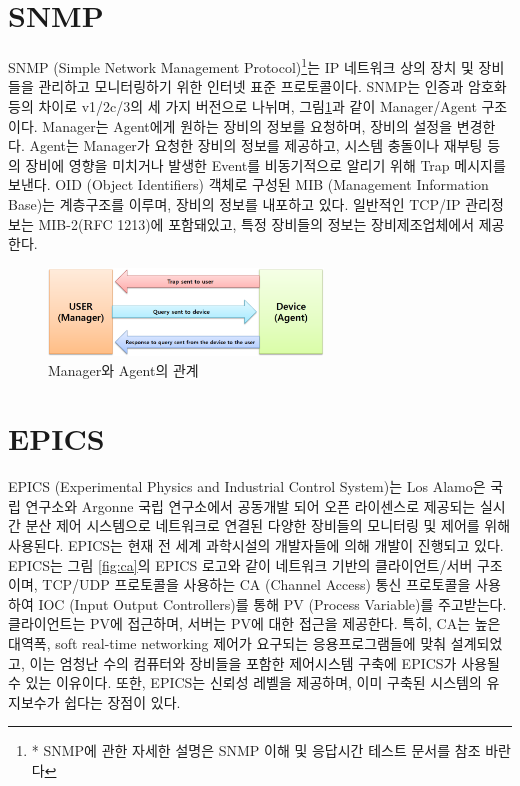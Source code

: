 \documentclass[11pt
  , a4paper
  , article
  , oneside
]{memoir}
\begin{document}
\section{SNMP}
SNMP (Simple Network Management Protocol)\footnote{* SNMP에 관한 자세한 설명은 SNMP 이해 및 응답시간 테스트 문서를 참조 바란다}는 IP 네트워크 상의 장치 및 장비들을 관리하고 모니터링하기 위한 인터넷 표준 프로토콜이다\citep{snmp}. SNMP는 인증과 암호화 등의 차이로 v1/2c/3의 세 가지 버전으로 나뉘며, 그림\ref{fig:relationship_m_a}과 같이 Manager/Agent 구조이다\citep{snmpm_a}. Manager는 Agent에게 원하는 장비의 정보를 요청하며, 장비의 설정을 변경한다. Agent는 Manager가 요청한 장비의 정보를 제공하고, 시스템 충돌이나 재부팅 등의 장비에 영향을 미치거나 발생한 Event를 비동기적으로 알리기 위해 Trap 메시지를 보낸다. OID (Object Identifiers) 객체로 구성된 MIB (Management Information Base)는 계층구조를 이루며, 장비의 정보를 내포하고 있다. 일반적인 TCP/IP 관리정보는 MIB-2(RFC 1213)에 포함돼있고, 특정 장비들의 정보는 장비제조업체에서 제공한다. 

\begin{figure}[h!]
  \centering
  \includegraphics[width=0.65\textwidth]{./images/relationship_m_a.eps}
  \caption{Manager와 Agent의 관계}
  \label{fig:relationship_m_a}   
\end{figure}

\hfill

\section{EPICS}
EPICS (Experimental Physics and Industrial Control System)는 Los Alamo은 국립 연구소와 Argonne 국립 연구소에서 공동개발 되어 오픈 라이센스로 제공되는 실시간 분산 제어 시스템으로 네트워크로 연결된 다양한 장비들의 모니터링 및 제어를 위해 사용된다. EPICS는 현재 전 세계 과학시설의 개발자들에 의해 개발이 진행되고 있다. EPICS는 그림 \ref{fig:ca}의 EPICS 로고와 같이 네트워크 기반의 클라이언트/서버 구조이며, TCP/UDP 프로토콜을 사용하는 CA (Channel Access) 통신 프로토콜을 사용하여 IOC (Input Output Controllers)를 통해 PV (Process Variable)를 주고받는다. 클라이언트는 PV에 접근하며, 서버는 PV에 대한 접근을 제공한다. 특히, CA는 높은 대역폭, soft real-time networking 제어가 요구되는 응용프로그램들에 맞춰 설계되었고, 이는 엄청난 수의 컴퓨터와 장비들을 포함한 제어시스템 구축에 EPICS가 사용될 수 있는 이유이다. 또한, EPICS는 신뢰성 레벨을 제공하며, 이미 구축된 시스템의 유지보수가 쉽다는 장점이 있다\citep{epics}. 
\end{document}
